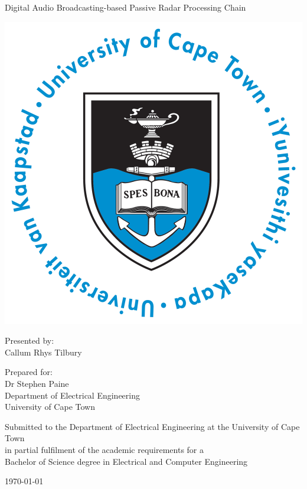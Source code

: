 \thispagestyle{empty}
\begin{center}
    
\Huge

\vspace{5cm}

Digital Audio Broadcasting-based Passive Radar Processing Chain

\vspace{2.5cm}

\includegraphics[width=0.4\linewidth]{FrontMatter/UCT_logo.png}

\vfill

\large
Presented by:\\
Callum Rhys Tilbury

\vspace{1cm}

Prepared for:\\
Dr Stephen Paine\\
Department of Electrical Engineering\\
University of Cape Town

\vspace{2cm}

\small
Submitted to the Department of Electrical Engineering at the University of Cape Town\\
in partial fulfilment of the academic requirements for a\\
Bachelor of Science degree in Electrical and Computer Engineering

\vspace{2cm}

\today
\end{center}